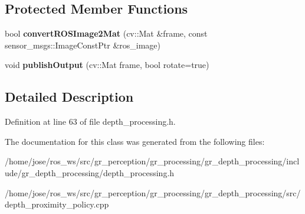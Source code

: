 \subsection*{Protected Member Functions}
\begin{DoxyCompactItemize}
\item 
\mbox{\label{classgr__depth__processing_1_1MyNodeletClass_a006212f234798dc83d11d2083349e208}} 
bool {\bfseries convert\+R\+O\+S\+Image2\+Mat} (cv\+::\+Mat \&frame, const sensor\+\_\+msgs\+::\+Image\+Const\+Ptr \&ros\+\_\+image)
\item 
\mbox{\label{classgr__depth__processing_1_1MyNodeletClass_ac4e58e420fec806922ad04cf7216a352}} 
void {\bfseries publish\+Output} (cv\+::\+Mat frame, bool rotate=true)
\end{DoxyCompactItemize}


\subsection{Detailed Description}


Definition at line 63 of file depth\+\_\+processing.\+h.



The documentation for this class was generated from the following files\+:\begin{DoxyCompactItemize}
\item 
/home/jose/ros\+\_\+ws/src/gr\+\_\+perception/gr\+\_\+processing/gr\+\_\+depth\+\_\+processing/include/gr\+\_\+depth\+\_\+processing/depth\+\_\+processing.\+h\item 
/home/jose/ros\+\_\+ws/src/gr\+\_\+perception/gr\+\_\+processing/gr\+\_\+depth\+\_\+processing/src/depth\+\_\+proximity\+\_\+policy.\+cpp\end{DoxyCompactItemize}
